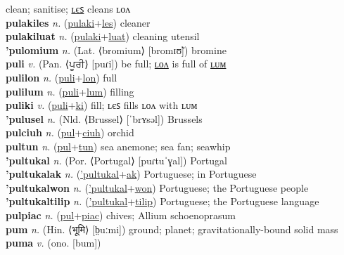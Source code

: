 clean; sanitise; \hyperref[pulakiles]{ʟєꜱ} cleans ʟᴏᴧ \label{pulaki} \\
\textbf{pulakiles} \textit{n.} (\hyperref[pulaki]{pulaki}+\hyperref[les]{les})
cleaner \label{pulakiles} \\
\textbf{pulakiluat} \textit{n.} (\hyperref[pulaki]{pulaki}+\hyperref[luat]{luat})
cleaning utensil \label{pulakiluat} \\
\textbf{'pulomium} \textit{n.} (Lat. ⟨bromium⟩ [bromɪʊ̃])
bromine \label{'pulomium} \\
\textbf{puli} \textit{v.} (Pan. ⟨ਪੂਰੀ⟩ [puɾi])
be full; \hyperref[pulilon]{ʟᴏᴧ} is full of \hyperref[pulilum]{ʟᴜᴍ} \label{puli} \\
\textbf{pulilon} \textit{n.} (\hyperref[puli]{puli}+\hyperref[lon]{lon})
full \label{pulilon} \\
\textbf{pulilum} \textit{n.} (\hyperref[puli]{puli}+\hyperref[lum]{lum})
filling \label{pulilum} \\
\textbf{puliki} \textit{v.} (\hyperref[puli]{puli}+\hyperref[ki]{ki})
fill; ʟєꜱ fills ʟᴏᴧ with ʟᴜᴍ \label{puliki} \\
\textbf{'pulusel} \textit{n.} (Nld. ⟨Brussel⟩ [ˈbrʏsəl])
Brussels \label{'pulusel} \\
\textbf{pulciuh} \textit{n.} (\hyperref[pul]{pul}+\hyperref[ciuh]{ciuh})
orchid \label{pulciuh} \\
\textbf{pultun} \textit{n.} (\hyperref[pul]{pul}+\hyperref[tun]{tun})
sea anemone; sea fan; seawhip \label{pultun} \\
\textbf{'pultukal} \textit{n.} (Por. ⟨Portugal⟩ [puɾtuˈɣal])
Portugal \label{'pultukal} \\
\textbf{'pultukalak} \textit{n.} (\hyperref['pultukal]{'pultukal}+\hyperref[ak]{ak})
Portuguese; in Portuguese \label{'pultukalak} \\
\textbf{'pultukalwon} \textit{n.} (\hyperref['pultukal]{'pultukal}+\hyperref[won]{won})
Portuguese; the Portuguese people \label{'pultukalwon} \\
\textbf{'pultukaltilip} \textit{n.} (\hyperref['pultukal]{'pultukal}+\hyperref[tilip]{tilip})
Portuguese; the Portuguese language \label{'pultukaltilip} \\
\textbf{pulpiac} \textit{n.} (\hyperref[pul]{pul}+\hyperref[piac]{piac})
chives; Allium schoenoprasum \label{pulpiac} \\
\textbf{pum} \textit{n.} (Hin. ⟨भूमि⟩ [b̤uːmi])
ground; planet; gravitationally-bound solid mass \label{pum} \\
\textbf{puma} \textit{v.} (ono. [bum])
